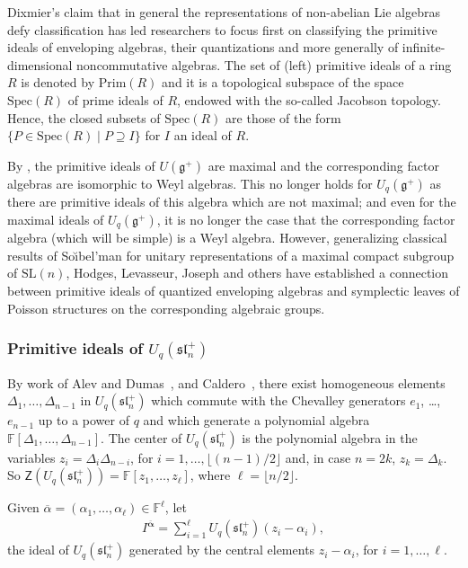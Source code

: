 \documentclass{commat}
\newcommand{\FF}{\mathbb{F}}
\newcommand{\barr}[1]{\overline{#1}}
\newcommand{\g}{\mathfrak g}
\newcommand{\fsl}{\mathfrak{sl}}
\begin{document}
Dixmier's claim that in general the representations of non-abelian Lie algebras defy classification has led researchers to focus first on classifying the primitive ideals of enveloping algebras, their quantizations and more generally of infinite-dimensional noncommutative algebras. The set of (left) primitive ideals of a ring $R$ is denoted by $\mathrm{Prim}(R)$ and it is a topological subspace of the space $\mathrm{Spec}(R)$ of prime ideals of $R$, endowed with the so-called Jacobson topology. Hence, the closed subsets of $\mathrm{Spec}(R)$ are those of the form 
$\{ P\in \mathrm{Spec}(R)\mid P\supseteq I \}$ for $I$ an ideal of $R$.




By \cite[Thm.\ 4.7.9]{jD96}, the primitive ideals of $U(\g^+)$ are maximal and the corresponding factor algebras are isomorphic to Weyl algebras. This no longer holds for $U_q(\g^+)$ as there are primitive ideals of this algebra which are not maximal; and even for the maximal ideals of $U_q(\g^+)$, it is no longer the case that the corresponding factor algebra (which will be simple) is a Weyl algebra. However, generalizing classical results of {So\u{\i}bel'man} for unitary representations of a maximal compact subgroup of $\mathrm{SL}(n)$, Hodges, Levasseur, Joseph and others have established a connection between primitive ideals of quantized enveloping algebras and symplectic leaves of Poisson structures on the corresponding algebraic groups. 


\subsubsection{Primitive ideals of \texorpdfstring{$U_q(\fsl_n^+)$}{Uq(sln+)}}\label{SS:rep:uq+:prim}




By work of Alev and Dumas~\cite{AD94}, and Caldero~\cite{pC94a, pC95}, there exist homogeneous elements $\Delta_1, \ldots, \Delta_{n-1}$ in $U_q(\fsl_n^+)$ which commute with the Chevalley generators $e_1$, \ldots, $e_{n-1}$ up to a power of $q$ and which generate a polynomial algebra $\FF[\Delta_1, \ldots, \Delta_{n-1}]$. The center of $U_q(\fsl_n^+)$ is the polynomial algebra in the variables $z_i=\Delta_i\Delta_{n-i}$, for $i=1, \ldots, \lfloor (n-1)/2\rfloor$ and, in case $n=2k$, $z_k=\Delta_k$. So $\mathsf{Z}(U_q(\fsl_n^+))=\FF[z_1, \ldots, z_\ell]$, where $\ell=\lfloor n/2\rfloor$.

Given $\barr \alpha=(\alpha_1, \ldots, \alpha_\ell)\in\FF^{\ell}$, let
\begin{align*}
	I^{\mathbf{\barr\alpha}}=\sum_{i=1}^\ell U_q(\fsl_n^+)(z_i-\alpha_i),
\end{align*}
the ideal of $U_q(\fsl_n^+)$ generated by the central elements $z_i-\alpha_i$, for $i=1, \ldots, \ell$.
\end{document}
